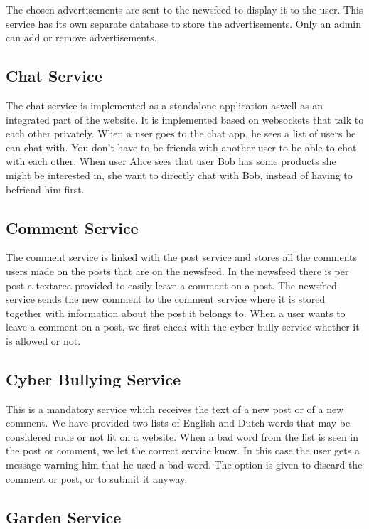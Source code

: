 \documentclass[a4paper,12pt]{article}
\begin{document}
The chosen advertisements are sent to the newsfeed to display it to the user. This service has its own separate database to store the advertisements. Only an admin can add or remove advertisements.

\subsection{Chat Service}

The chat service is implemented as a standalone application aswell as an integrated part of the website. It is implemented based on websockets that talk to each other privately. When a user goes to the chat app, he sees a list of users he can chat with. You don't have to be friends with another user to be able to chat with each other. When user Alice sees that user Bob has some products she might be interested in, she want to directly chat with Bob, instead of having to befriend him first.

\subsection{Comment Service}

The comment service is linked with the post service and stores all the comments users made on the posts that are on the newsfeed. In the newsfeed there is per post a textarea provided to easily leave a comment on a post. The newsfeed service sends the new comment to the comment service where it is stored together with information about the post it belongs to. When a user wants to leave a comment on a post, we first check with the cyber bully service whether it is allowed or not. 

\subsection{Cyber Bullying Service}

This is a mandatory service which receives the text of a new post or of a new comment. We have provided two lists of English and Dutch words that may be considered rude or not fit on a website. When a bad word from the list is seen in the post or comment, we let the correct service know. In this case the user gets a message warning him that he used a bad word. The option is given to discard the comment or post, or to submit it anyway.

\subsection{Garden Service}
\end{document}

